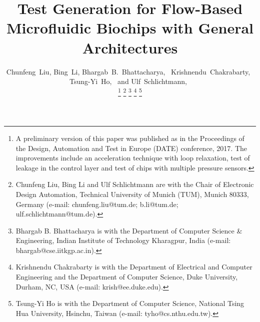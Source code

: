 \documentclass[journal,twoside]{IEEEtran}
\begin{document}
\graphicspath{{Fig/}}
\def\figname{Fig.}
\def\algname{Algorithm}
\newcommand{\figurefontsize}{\footnotesize}
\newcommand{\papertitle}{Test Generation for Flow-Based Microfluidic
Biochips with General Architectures}
\newcommand{\tum}{Technical University of Munich (TUM)}

%


\title{\papertitle}

\author{	
Chunfeng~Liu, Bing~Li, Bhargab~B.~Bhattacharya,~ Krishnendu~Chakrabarty,~
Tsung-Yi~Ho,~ and Ulf~Schlichtmann,~

\thanks{A preliminary version of this paper was published as \cite{CBBK17} in
the Proceedings of the Design, Automation and Test in Europe (DATE)
conference, 2017. The improvements include an acceleration technique with loop
relaxation, test of leakage in the control layer and test of chips with multiple
pressure sensors.}
          \thanks{Chunfeng Liu, Bing Li and Ulf Schlichtmann are with the Chair
	    of Electronic Design Automation,
          \tum, Munich 80333, Germany (e-mail: chunfeng.liu@tum.de; b.li@tum.de;
  ulf.schlichtmann@tum.de).}
  \thanks{Bhargab B. Bhattacharya is with the
    Department of Computer Science \& Engineering, Indian Institute of
    Technology Kharagpur, India (e-mail: bhargab@cse.iitkgp.ac.in).}
           \thanks{Krishnendu Chakrabarty is with the Department of 
	     Electrical and Computer Engineering and the Department of Computer
	     Science, Duke University, Durham, NC, USA (e-mail: krish@ee.duke.edu).}
            \thanks{Tsung-Yi Ho is with the Department of Computer Science,  
	    National Tsing Hua University, Hsinchu, Taiwan (e-mail: tyho@cs.nthu.edu.tw).}
}
\end{document}
